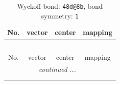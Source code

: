 \documentclass[fleqn,8pt]{jsarticle}
\begin{document}
\renewcommand{\arraystretch}{1.2}
\begin{longtable}{cccc}
\caption{Wyckoff bond: {\tt 48d@8b}, bond symmetry: {\tt 1}}
 \\
 \hline \hline
No. & vector & center & mapping \\ \hline \endfirsthead

\multicolumn{3}{l}{\tablename\ \thetable{}} \\
 \hline \hline
No. & vector & center & mapping \\ \hline \endhead

 \hline \hline
\multicolumn{3}{r}{\footnotesize\it continued ...} \\ \endfoot

 \hline \hline
\multicolumn{3}{r}{} \\ \endlastfoot


\end{longtable}
\end{document}

